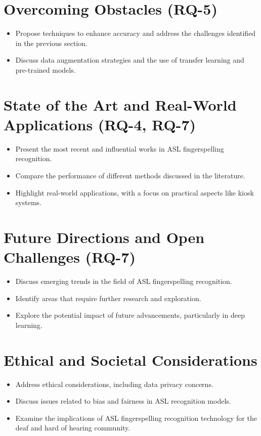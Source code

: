 \section{Overcoming Obstacles (RQ-5)}

\begin{itemize}
    \item Propose techniques to enhance accuracy and address the challenges identified in the previous section.
    \item Discuss data augmentation strategies and the use of transfer learning and pre-trained models.
\end{itemize}

\section{State of the Art and Real-World Applications (RQ-4, RQ-7)}

\begin{itemize}
    \item Present the most recent and influential works in ASL fingerspelling recognition.
    \item Compare the performance of different methods discussed in the literature.
    \item Highlight real-world applications, with a focus on practical aspects like kiosk systems.
\end{itemize}

\section{Future Directions and Open Challenges (RQ-7)}

\begin{itemize}
    \item Discuss emerging trends in the field of ASL fingerspelling recognition.
    \item Identify areas that require further research and exploration.
    \item Explore the potential impact of future advancements, particularly in deep learning.
\end{itemize}

\section{Ethical and Societal Considerations}

\begin{itemize}
    \item Address ethical considerations, including data privacy concerns.
    \item Discuss issues related to bias and fairness in ASL recognition models.
    \item Examine the implications of ASL fingerspelling recognition technology for the deaf and hard of hearing community.
\end{itemize}

